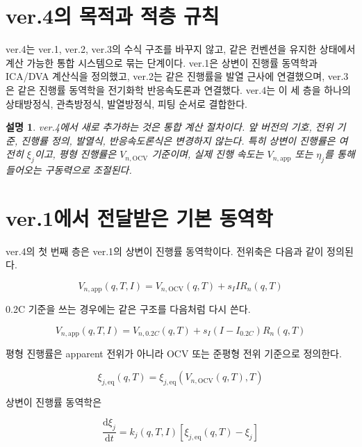 \documentclass[11pt,a4paper]{article}
\newtheorem*{note}{설명}
\newcommand{\dd}{\mathrm{d}}
\newcommand{\OCV}{\mathrm{OCV}}
\newcommand{\app}{\mathrm{app}}
\newcommand{\eq}{\mathrm{eq}}
\begin{document}
\section{ver.4의 목적과 적층 규칙}
ver.4는 ver.1, ver.2, ver.3의 수식 구조를 바꾸지 않고, 같은 컨벤션을 유지한 상태에서 계산 가능한 통합 시스템으로 묶는 단계이다. ver.1은 상변이 진행률 동역학과 ICA/DVA 계산식을 정의했고, ver.2는 같은 진행률을 발열 근사에 연결했으며, ver.3은 같은 진행률 동역학을 전기화학 반응속도론과 연결했다. ver.4는 이 세 층을 하나의 상태방정식, 관측방정식, 발열방정식, 피팅 순서로 결합한다.

\begin{note}
ver.4에서 새로 추가하는 것은 통합 계산 절차이다. 앞 버전의 기호, 전위 기준, 진행률 정의, 발열식, 반응속도론식은 변경하지 않는다. 특히 상변이 진행률은 여전히 \(\xi_j\)이고, 평형 진행률은 \(V_{n,\OCV}\) 기준이며, 실제 진행 속도는 \(V_{n,\app}\) 또는 \(\eta_j\)를 통해 들어오는 구동력으로 조절된다.
\end{note}

\section{ver.1에서 전달받은 기본 동역학}
ver.4의 첫 번째 층은 ver.1의 상변이 진행률 동역학이다. 전위축은 다음과 같이 정의된다.

\begin{equation}
V_{n,\app}(q,T,I)=V_{n,\OCV}(q,T)+s_IIR_n(q,T)
\label{eq:v4_vapp_ocv}
\end{equation}

0.2C 기준을 쓰는 경우에는 같은 구조를 다음처럼 다시 쓴다.

\begin{equation}
V_{n,\app}(q,T,I)=V_{n,0.2C}(q,T)+s_I(I-I_{0.2C})R_n(q,T)
\label{eq:v4_vapp_02c}
\end{equation}

평형 진행률은 apparent 전위가 아니라 OCV 또는 준평형 전위 기준으로 정의한다.

\begin{equation}
\xi_{j,\eq}(q,T)=\xi_{j,\eq}\!\left(V_{n,\OCV}(q,T),T\right)
\label{eq:v4_xieq}
\end{equation}

상변이 진행률 동역학은

\begin{equation}
\frac{\dd\xi_j}{\dd t}=k_j(q,T,I)\left[\xi_{j,\eq}(q,T)-\xi_j\right]
\label{eq:v4_xi_t_basic}
\end{equation}
\end{document}
